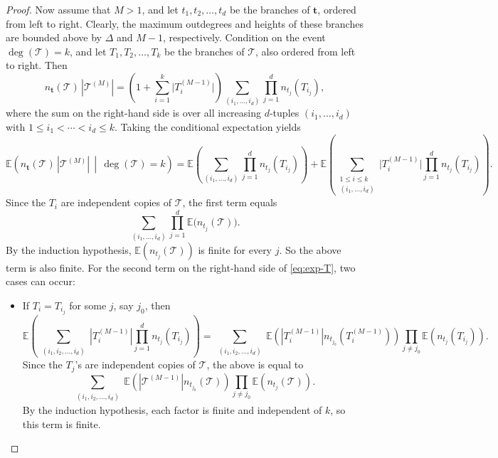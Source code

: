 \documentclass[article]{amsart}
\newcommand{\tc}{\mathcal{T}}
\newcommand{\st}{\textbf{t}}
\newcommand{\n}{n_{\st}}
\theoremstyle{definition}
\theoremstyle{remark}
\begin{document}
\begin{proof}
Now assume that $M > 1$, and let $t_1, t_2, \dots, t_d$ be the branches of $\st$, ordered from left to right. Clearly, the maximum outdegrees and heights of these branches are bounded above by $\Delta$ and $M-1$, respectively. Condition on the event $\deg(\tc) = k$, and let $T_1, T_2, \dots, T_k$ be the branches of $\tc$, also ordered from left to right. Then
\[
\n(\tc)\,|\tc^{(M)}|
= \left(1 + \sum_{i=1}^{k} \bigl|T_i^{(M-1)}\bigr|\right)
  \sum_{(i_1,\dots,i_d)} \prod_{j=1}^{d} n_{t_j}(T_{i_j}),
\]
where the sum on the right-hand side is over all increasing $d$-tuples $(i_1,\dots,i_d)$ with
$1 \le i_1 < \cdots < i_d \le k$. Taking the conditional expectation yields
\begin{equation}\label{eq:exp-T}
\mathbb{E}\!\left( \n(\tc)\,|\tc^{(M)}| \,\middle|\, \deg(\tc)=k \right)
= \mathbb{E}\!\left( \sum_{(i_1,\dots,i_d)} \prod_{j=1}^{d} n_{t_j}(T_{i_j}) \right)
  + \mathbb{E}\!\left( \sum_{\substack{1\le i\le k \\ (i_1,\dots,i_d)}} 
     \bigl|T_i^{(M-1)}\bigr| \prod_{j=1}^{d} n_{t_j}(T_{i_j}) \right).
\end{equation}
Since the $T_i$ are independent copies of $\tc$, the first term equals
\[
\sum_{(i_1,\dots,i_d)} \prod_{j=1}^{d} \mathbb{E}\bigl(n_{t_j}(\tc)\bigr).
\]
By the induction hypothesis, $\mathbb{E} \left( n_{t_j}(\tc) \right)$ is finite for every $j$. So the above term is also finite. For the second term on the right-hand side of \eqref{eq:exp-T}, two cases can occur:
\begin{itemize}
    \item If $T_i = T_{i_j}$ for some $j$, say $j_0$, then
    \[
    \mathbb{E} \left( \sum_{\substack{(i_1, i_2, \dots, i_d)}} \left| T_i^{(M-1)} \right| \prod_{j=1}^{d} n_{t_j}(T_{i_j}) \right)
    = \sum_{\substack{(i_1, i_2, \dots, i_d)}} \mathbb{E} \left( \left| T_i^{(M-1)} \right| n_{t_{j_0}}(T_i^{(M-1)}) \right) \prod_{j \neq j_0} \mathbb{E} \left( n_{t_j}(T_{i_j}) \right).
    \]
    Since the $T_j$'s are independent copies of $\tc$, the above is equal to
    \[
    \sum_{\substack{(i_1, i_2, \dots, i_d)}} \mathbb{E} \left( \left| \tc^{(M-1)} \right| n_{t_{j_0}}(\tc) \right) \prod_{j \neq j_0} \mathbb{E} \left( n_{t_j}(\tc) \right).
    \]
    By the induction hypothesis, each factor is finite and independent of $k$, so this term is finite.


\end{itemize}
\end{proof}
\end{document}
